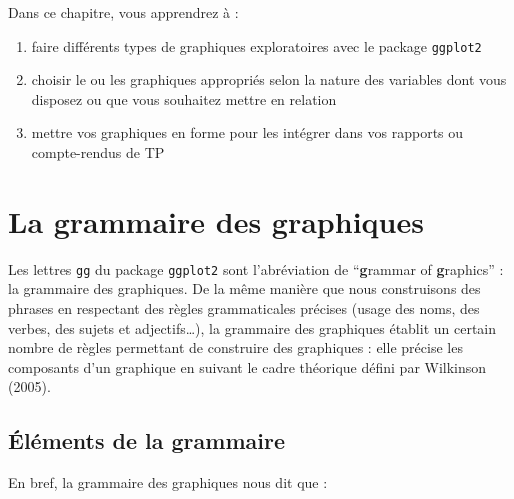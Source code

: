 \documentclass[
  a4paper,
  DIV=11,
  numbers=noendperiod,
  oneside]{scrreprt}
\providecommand{\tightlist}{%
  \setlength{\itemsep}{0pt}\setlength{\parskip}{0pt}}\usepackage{longtable,booktabs,array}
\begin{document}
\begin{tcolorbox}[enhanced jigsaw, colbacktitle=quarto-callout-tip-color!10!white, left=2mm, leftrule=.75mm, titlerule=0mm, bottomtitle=1mm, colback=white, breakable, arc=.35mm, bottomrule=.15mm, toprule=.15mm, toptitle=1mm, opacitybacktitle=0.6, title=\textcolor{quarto-callout-tip-color}{\faLightbulb}\hspace{0.5em}{Objectifs}, coltitle=black, rightrule=.15mm, opacityback=0, colframe=quarto-callout-tip-color-frame]

Dans ce chapitre, vous apprendrez à :

\begin{enumerate}
\def\labelenumi{\arabic{enumi}.}
\tightlist
\item
  faire différents types de graphiques exploratoires avec le package
  \texttt{ggplot2}  
\item
  choisir le ou les graphiques appropriés selon la nature des variables
  dont vous disposez ou que vous souhaitez mettre en relation
\item
  mettre vos graphiques en forme pour les intégrer dans vos rapports ou
  compte-rendus de TP
\end{enumerate}

\end{tcolorbox}

\section{La grammaire des graphiques}\label{sec-gggraph}

Les lettres \texttt{gg} du package \texttt{ggplot2} sont l'abréviation
de ``\textbf{g}rammar of \textbf{g}raphics'' : la grammaire des
graphiques. De la même manière que nous construisons des phrases en
respectant des règles grammaticales précises (usage des noms, des
verbes, des sujets et adjectifs\ldots), la grammaire des graphiques
établit un certain nombre de règles permettant de construire des
graphiques : elle précise les composants d'un graphique en suivant le
cadre théorique défini par Wilkinson (2005).

\subsection{Éléments de la
grammaire}\label{uxe9luxe9ments-de-la-grammaire}

En bref, la grammaire des graphiques nous dit que :
\end{document}
